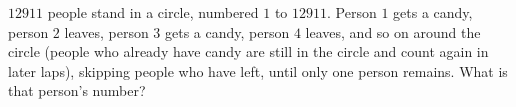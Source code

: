 $12911$ people stand in a circle, numbered $1$ to $12911$. Person $1$ gets a candy, person $2$ leaves, person $3$ gets a candy, person $4$ leaves, and so on around the circle (people who already have candy are still in the circle and count again in later laps), skipping people who have left, until only one person remains. What is that person's number?
